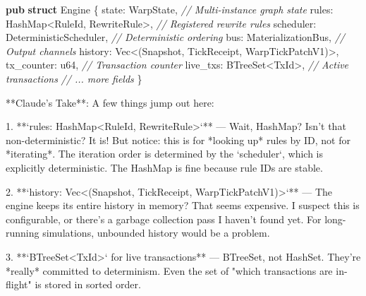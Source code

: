 \documentclass[
  11pt,
]{book}
\newenvironment{Shaded}{}{}
\newcommand{\CommentTok}[1]{\textcolor[rgb]{0.38,0.63,0.69}{\textit{#1}}}
\newcommand{\DataTypeTok}[1]{\textcolor[rgb]{0.56,0.13,0.00}{#1}}
\newcommand{\KeywordTok}[1]{\textcolor[rgb]{0.00,0.44,0.13}{\textbf{#1}}}
\newcommand{\NormalTok}[1]{#1}
\newcommand{\OperatorTok}[1]{\textcolor[rgb]{0.40,0.40,0.40}{#1}}
\begin{document}
\begin{Shaded}
\begin{Highlighting}[]
\KeywordTok{pub} \KeywordTok{struct}\NormalTok{ Engine }\OperatorTok{\{}
\NormalTok{    state}\OperatorTok{:}\NormalTok{ WarpState}\OperatorTok{,}                           \CommentTok{// Multi{-}instance graph state}
\NormalTok{    rules}\OperatorTok{:}\NormalTok{ HashMap}\OperatorTok{\textless{}}\NormalTok{RuleId}\OperatorTok{,}\NormalTok{ RewriteRule}\OperatorTok{\textgreater{},}        \CommentTok{// Registered rewrite rules}
\NormalTok{    scheduler}\OperatorTok{:}\NormalTok{ DeterministicScheduler}\OperatorTok{,}          \CommentTok{// Deterministic ordering}
\NormalTok{    bus}\OperatorTok{:}\NormalTok{ MaterializationBus}\OperatorTok{,}                    \CommentTok{// Output channels}
\NormalTok{    history}\OperatorTok{:} \DataTypeTok{Vec}\OperatorTok{\textless{}}\NormalTok{(Snapshot}\OperatorTok{,}\NormalTok{ TickReceipt}\OperatorTok{,}\NormalTok{ WarpTickPatchV1)}\OperatorTok{\textgreater{},}
\NormalTok{    tx\_counter}\OperatorTok{:} \DataTypeTok{u64}\OperatorTok{,}                            \CommentTok{// Transaction counter}
\NormalTok{    live\_txs}\OperatorTok{:}\NormalTok{ BTreeSet}\OperatorTok{\textless{}}\NormalTok{TxId}\OperatorTok{\textgreater{},}                   \CommentTok{// Active transactions}
    \CommentTok{// ... more fields}
\OperatorTok{\}}
\end{Highlighting}
\end{Shaded}

\begin{claudecommentary}
**Claude's Take**: A few things jump out here:

1. **`rules: HashMap<RuleId, RewriteRule>`** — Wait, HashMap? Isn't that non-deterministic? It is! But notice: this is for *looking up* rules by ID, not for *iterating*. The iteration order is determined by the `scheduler`, which is explicitly deterministic. The HashMap is fine because rule IDs are stable.

2. **`history: Vec<(Snapshot, TickReceipt, WarpTickPatchV1)>`** — The engine keeps its entire history in memory? That seems expensive. I suspect this is configurable, or there's a garbage collection pass I haven't found yet. For long-running simulations, unbounded history would be a problem.

3. **`BTreeSet<TxId>` for live transactions** — BTreeSet, not HashSet. They're *really* committed to determinism. Even the set of "which transactions are in-flight" is stored in sorted order.
\end{claudecommentary}
\end{document}
